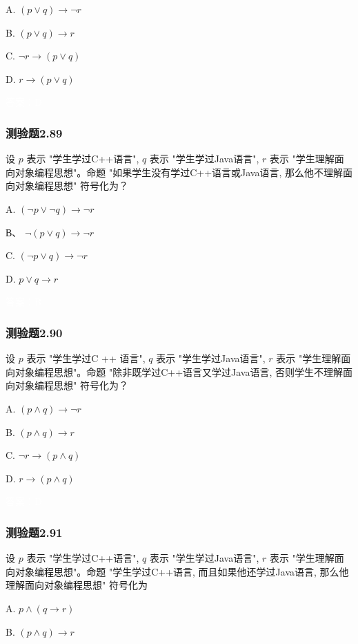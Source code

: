 \documentclass[UTF8, heading=true]{ctexart}
\begin{document}
A. $
(p \vee q) \rightarrow \neg r
$

B. $
(p \vee q) \rightarrow r
$

C. $
\neg r \rightarrow(p \vee q)
$

D. $
r \rightarrow(p \vee q)
$

\textcolor{white}{答案：D}


\subsubsection{测验题2.89}

设 $p$ 表示 "学生学过C++语言", $q$ 表示 "学生学过Java语言", $r$ 表示
 "学生理解面向对象编程思想"。命题 "如果学生没有学过C++语言或Java语言, 
 那么他不理解面向对象编程思想" 符号化为？

A. $(\neg p \vee \neg q) \rightarrow \neg r$

В、 $\neg(p \vee q) \rightarrow \neg r$

C. $(\neg p \vee q) \rightarrow \neg r$

D. $ p \vee q \rightarrow r$

\textcolor{white}{答案：B}

\subsubsection{测验题2.90}

设 $p$ 表示 "学生学过C ++ 语言", $q$ 表示 "学生学过Java语言", $r$ 表示 
"学生理解面向对象编程思想"。命题 "除非既学过C++语言又学过Java语言, 
否则学生不理解面向对象编程思想" 符号化为？

A. $(p \wedge q) \rightarrow \neg r$

B. $(p \wedge q) \rightarrow r$

C. $ \neg r \rightarrow(p \wedge q)$

D. $ r \rightarrow(p \wedge q)$

\textcolor{white}{答案：D}

\subsubsection{测验题2.91}

设 $p$ 表示 "学生学过C++语言", $q$ 表示 "学生学过Java语言", $r$ 表示 
"学生理解面向对象编程思想"。命题 "学生学过C++语言, 而且如果他还学过Java语言, 
那么他理解面向对象编程思想" 符号化为 $\qquad$

A. $p \wedge(q \rightarrow r)$

B. $(p \wedge q) \rightarrow r$
\end{document}
